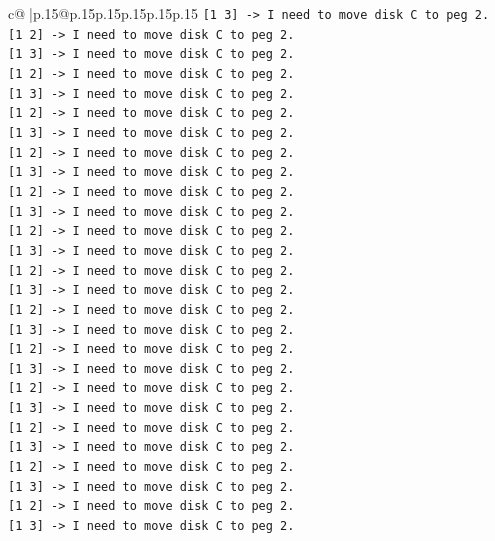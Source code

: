 \documentclass{article}
\begin{document}
{\begin{supertabular}{c@{$\;$}|p{.15\linewidth}@{}p{.15\linewidth}p{.15\linewidth}p{.15\linewidth}p{.15\linewidth}p{.15\linewidth}}
{{{\texttt{{[}1 3{]} {-}> I need to move disk C to peg 2.} \\
\texttt{{[}1 2{]} {-}> I need to move disk C to peg 2.} \\
\texttt{{[}1 3{]} {-}> I need to move disk C to peg 2.} \\
\texttt{{[}1 2{]} {-}> I need to move disk C to peg 2.} \\
\texttt{{[}1 3{]} {-}> I need to move disk C to peg 2.} \\
\texttt{{[}1 2{]} {-}> I need to move disk C to peg 2.} \\
\texttt{{[}1 3{]} {-}> I need to move disk C to peg 2.} \\
\texttt{{[}1 2{]} {-}> I need to move disk C to peg 2.} \\
\texttt{{[}1 3{]} {-}> I need to move disk C to peg 2.} \\
\texttt{{[}1 2{]} {-}> I need to move disk C to peg 2.} \\
\texttt{{[}1 3{]} {-}> I need to move disk C to peg 2.} \\
\texttt{{[}1 2{]} {-}> I need to move disk C to peg 2.} \\
\texttt{{[}1 3{]} {-}> I need to move disk C to peg 2.} \\
\texttt{{[}1 2{]} {-}> I need to move disk C to peg 2.} \\
\texttt{{[}1 3{]} {-}> I need to move disk C to peg 2.} \\
\texttt{{[}1 2{]} {-}> I need to move disk C to peg 2.} \\
\texttt{{[}1 3{]} {-}> I need to move disk C to peg 2.} \\
\texttt{{[}1 2{]} {-}> I need to move disk C to peg 2.} \\
\texttt{{[}1 3{]} {-}> I need to move disk C to peg 2.} \\
\texttt{{[}1 2{]} {-}> I need to move disk C to peg 2.} \\
\texttt{{[}1 3{]} {-}> I need to move disk C to peg 2.} \\
\texttt{{[}1 2{]} {-}> I need to move disk C to peg 2.} \\
\texttt{{[}1 3{]} {-}> I need to move disk C to peg 2.} \\
\texttt{{[}1 2{]} {-}> I need to move disk C to peg 2.} \\
\texttt{{[}1 3{]} {-}> I need to move disk C to peg 2.} \\
\texttt{{[}1 2{]} {-}> I need to move disk C to peg 2.} \\
\texttt{{[}1 3{]} {-}> I need to move disk C to peg 2.} \\
}}}
\end{supertabular}}
\end{document}
